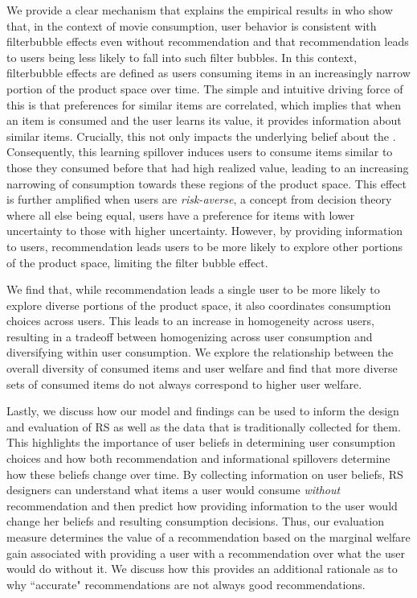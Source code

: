 \documentclass[manuscript]{acmart}
\newcommand{\xhdr}[1]{\vspace{1mm} \noindent{\bf #1}}
\begin{document}
\xhdr{Our Contributions\dgedit{.}}
We provide a clear mechanism that explains the empirical results in \cite{nguyen2014exploring} who show that, in the context of movie consumption, user behavior is consistent with filter\dgedit{-}bubble effects even without recommendation and that recommendation leads to users being less likely to fall into such filter bubbles. In this context, filter\dgedit{-}bubble effects are defined as users consuming items in an increasingly narrow portion of the product space over time. The simple and intuitive driving force of this is that preferences for similar items are correlated, which implies that when an item is consumed and the user learns its value, it provides information about similar items. Crucially, this not only impacts the underlying belief about the . Consequently, this learning spillover induces users to consume items similar to those they consumed before that had high realized value, leading to an increasing narrowing of consumption towards these regions of the product space. This effect is further amplified when users are \textit{risk-averse}, a concept from decision theory where all else being equal, users have a preference for items with lower uncertainty to those with higher uncertainty. However, by providing information to users, recommendation leads users to be more likely to explore other portions of the product space, limiting the filter bubble effect.
\par
We find that, while recommendation leads a single user to be more likely to explore diverse portions of the product space, it also coordinates consumption choices across users. This leads to an increase in homogeneity across users, resulting in a tradeoff between homogenizing across user consumption and diversifying within user consumption. We explore the relationship between the overall diversity of consumed items and user welfare and find that more diverse sets of consumed items do not always correspond to higher user welfare. 
\par
Lastly, we discuss how our model and findings can be used to inform the design and evaluation of RS as well as the data that is traditionally collected for them. This highlights the importance of user beliefs in determining user consumption choices and how both recommendation and informational spillovers determine how these beliefs change over time. By collecting information on user beliefs, RS designers can understand what items a user would consume \textit{without} recommendation and then predict how providing information to the user would change her beliefs and resulting consumption decisions. Thus,  our evaluation measure determines the value of a recommendation based on the marginal welfare gain associated with providing a user with a recommendation over what the user would do without it. We discuss how this provides an additional rationale as to why ``accurate" recommendations are not always good recommendations.
\end{document}
